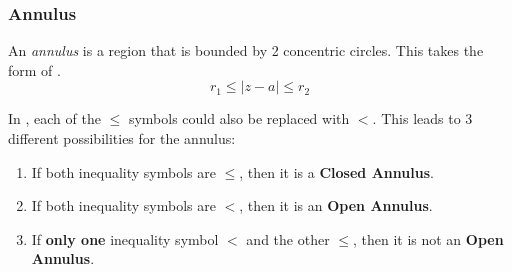 \subsubsection{Annulus}\label{subsubsec:Annulus}
\begin{definition}[Annulus]\label{def:Annulus}
  An \emph{annulus} is a region that is bounded by 2 concentric circles.
  This takes the form of .
  \begin{equation}\label{eq:Annulus}
    r_{1} \leq \lvert z - a \rvert \leq r_{2}
  \end{equation}

  In , each of the $\leq$ symbols could also be replaced with $<$.
  This leads to 3 different possibilities for the annulus:
  \begin{enumerate}[noitemsep]
  \item If both inequality symbols are $\leq$, then it is a \textbf{Closed Annulus}.
  \item If both inequality symbols are $<$, then it is an \textbf{Open Annulus}.
  \item If \textbf{only one} inequality symbol $<$ and the other $\leq$, then it is not an \textbf{Open Annulus}.
  \end{enumerate}
\end{definition}


